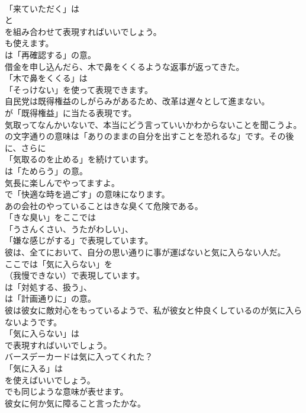 \documentclass[8pt]{extreport}
\begin{document}
\begin{CJK}{UTF8}{min}
\\	「来ていただく」は 
\\	と 
\\	を組み合わせて表現すればいいでしょう。
\\	も使えます。
\\	は「再確認する」の意。	
\\	借金を申し込んだら、木で鼻をくくるような返事が返ってきた。 
\\	「木で鼻をくくる」は
\\	「そっけない」を使って表現できます。	
\\	自民党は既得権益のしがらみがあるため、改革は遅々として進まない。 
\\	が「既得権益」に当たる表現です。	
\\	気取ってなんかいないで、本当にどう言っていいかわからないことを聞こうよ。 
\\	の文字通りの意味は「ありのままの自分を出すことを恐れるな」です。その後に、さらに
\\	「気取るのを止める」を続けています。
\\	は「ためらう」の意。	
\\	気長に楽しんでやってますよ。 
\\	で「快適な時を過ごす」の意味になります。	
\\	あの会社のやっていることはきな臭くて危険である。 
\\	「きな臭い」をここでは
\\	「うさんくさい、うたがわしい」、
\\	「嫌な感じがする」で表現しています。	
\\	彼は、全てにおいて、自分の思い通りに事が運ばないと気に入らない人だ。 
\\	ここでは「気に入らない」を 
\\	（我慢できない）で表現しています。
\\	は「対処する、扱う」、
\\	は「計画通りに」の意。	
\\	彼は彼女に敵対心をもっているようで、私が彼女と仲良くしているのが気に入らないようです。 
\\	「気に入らない」は 
\\	で表現すればいいでしょう。	
\\	バースデーカードは気に入ってくれた？ 
\\	「気に入る」は
\\	を使えばいいでしょう。
\\	でも同じような意味が表せます。	
\\	彼女に何か気に障ること言ったかな。 

\end{CJK}
\end{document}
